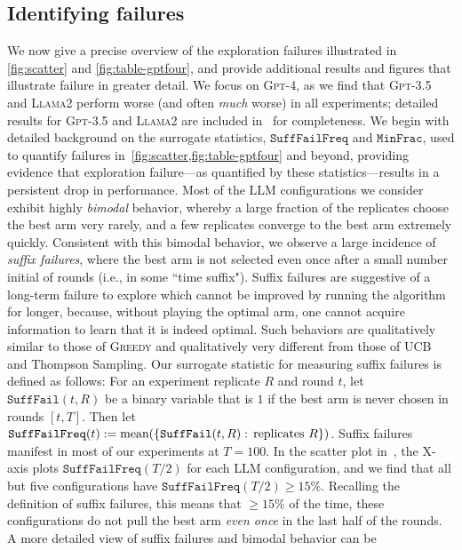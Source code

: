 \documentclass[11pt]{article}
\newcommand{\gptfour}{\textsc{Gpt-4}\xspace}
\newcommand{\gptthree}{\textsc{Gpt-3.5}\xspace}
\newcommand{\llama}{\textsc{Llama2}\xspace}
\newcommand{\ucb}{\textsc{UCB}\xspace}
\newcommand{\greedy}{\textsc{Greedy}\xspace}
\newcommand{\MinFrac}{\texttt{MinFrac}}
\newcommand{\SuffFail}{\texttt{SuffFail}}
\newcommand{\SuffFailFreq}{\texttt{SuffFailFreq}}
\newcommand{\xhdr}[1]{\vspace{2mm} \noindent{\bf #1}}
\begin{document}
\subsection{Identifying failures}
\label{ssec:exp-failures}
We now give a precise overview of the exploration failures illustrated in
\cref{fig:scatter} and \cref{fig:table-gptfour}, and provide
additional results and figures that illustrate failure in greater detail. We focus
on \gptfour, as
we find that \gptthree and \llama perform worse (and often \emph{much}
worse) in all experiments; detailed results for \gptthree and \llama
are included in~ for completeness. We begin
with detailed background on the surrogate statistics, $\SuffFailFreq$
and $\MinFrac$, used to quantify failures
in~\cref{fig:scatter,fig:table-gptfour} and beyond, providing evidence that exploration
failure---as quantified by these statistics---results in a persistent drop in performance.
\xhdr{Suffix failures.}
Most of the LLM configurations we consider exhibit highly
\emph{bimodal} behavior, whereby a large fraction of the replicates
choose the best arm very rarely, and a few
replicates converge to the best arm extremely quickly. Consistent with
this bimodal behavior, we observe a large incidence of \emph{suffix
  failures}, where the best arm is not selected even once after a
small number initial of rounds (i.e., in some ``time suffix"). Suffix failures are suggestive of a long-term failure to explore which cannot be improved by running the algorithm for longer, because, without playing the optimal arm, one cannot acquire information to learn that it is indeed optimal. Such behaviors
are qualitatively similar to those of \greedy
and qualitatively very different from those of \ucb and Thompson Sampling.
Our surrogate statistic for measuring suffix failures is defined as
follows: For an experiment replicate $R$ and round $t$, let
$\SuffFail(t,R)$ be a binary variable that is $1$ if the best arm is
never chosen in rounds $[t,T]$. Then let $\SuffFailFreq(t) :=
\text{mean}(\cbr{\SuffFail(t,R):\, \text{replicates $R$}})$. Suffix failures manifest in most of our experiments at $T=100$.
In the scatter plot in~, the X-axis plots $\SuffFailFreq(T/2)$ for each
LLM configuration, and we find that all but five configurations have
$\SuffFailFreq(T/2) \geq 15\%$. Recalling the definition of suffix
failures, this means that $\geq15\%$ of the time, these configurations do
not pull the best arm \emph{even once} in the last half of the rounds.
A more detailed view of suffix failures and bimodal behavior can be
\end{document}
